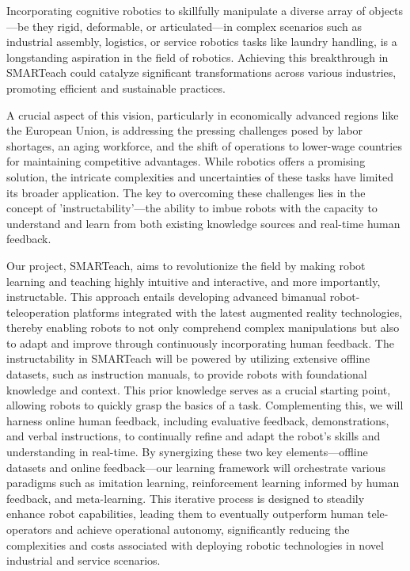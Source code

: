 \begin{refsection}

Incorporating cognitive robotics to skillfully manipulate a diverse array of objects—be they rigid, deformable, or articulated—in complex scenarios such as industrial assembly, logistics, or service robotics tasks like laundry handling, is a longstanding aspiration in the field of robotics. Achieving this breakthrough in SMARTeach could catalyze significant transformations across various industries, promoting efficient and sustainable practices.

A crucial aspect of this vision, particularly in economically advanced regions like the European Union, is addressing the pressing challenges posed by labor shortages, an aging workforce, and the shift of operations to lower-wage countries for maintaining competitive advantages. While robotics offers a promising solution, the intricate complexities and uncertainties of these tasks have limited its broader application. The key to overcoming these challenges lies in the concept of 'instructability'—the ability to imbue robots with the capacity to understand and learn from both existing knowledge sources and real-time human feedback.

Our project, SMARTeach, aims to revolutionize the field by making robot learning and teaching highly intuitive and interactive, and more importantly, instructable. This approach entails developing advanced bimanual robot-teleoperation platforms integrated with the latest augmented reality technologies, thereby enabling robots to not only comprehend complex manipulations but also to adapt and improve through continuously incorporating human feedback. The instructability in SMARTeach will be powered by utilizing extensive offline datasets, such as instruction manuals, to provide robots with foundational knowledge and context. This prior knowledge serves as a crucial starting point, allowing robots to quickly grasp the basics of a task. Complementing this, we will harness online human feedback, including evaluative feedback, demonstrations, and verbal instructions, to continually refine and adapt the robot's skills and understanding in real-time. By synergizing these two key elements—offline datasets and online feedback—our learning framework will orchestrate various paradigms such as imitation learning, reinforcement learning informed by human feedback, and meta-learning.
This iterative process is designed to steadily enhance robot capabilities, leading them to eventually outperform human tele-operators and achieve operational autonomy, significantly reducing the complexities and costs associated with deploying robotic technologies in novel industrial and service scenarios.


\end{refsection}
